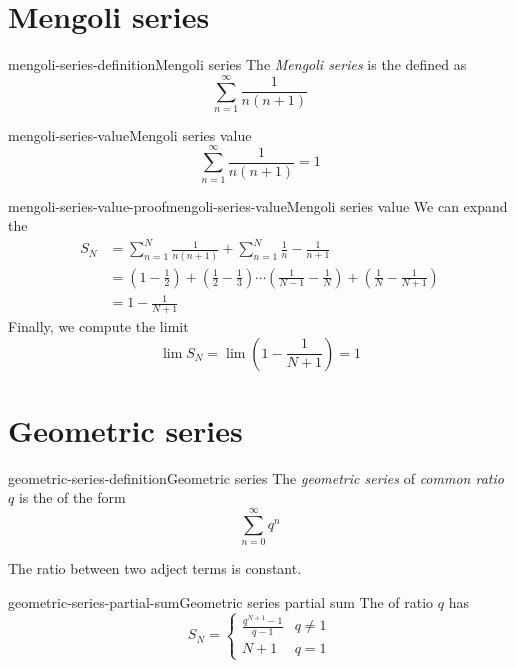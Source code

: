 \documentclass[preview]{standalone}
\begin{document}
\genpage

\section{Mengoli series}

\begin{snippetdefinition}{mengoli-series-definition}{Mengoli series}
    The \emph{Mengoli series} is the \series defined as
    \[
        \sum_{n=1}^\infty \frac{1}{n(n+1)}
    \]
\end{snippetdefinition}

\begin{snippetproposition}{mengoli-series-value}{Mengoli series value}
    \[
        \sum_{n=1}^\infty \frac{1}{n(n+1)} = 1
    \]
\end{snippetproposition}

\begin{snippetproof}{mengoli-series-value-proof}{mengoli-series-value}{Mengoli series value}
    We can expand the \partialsum
    \begin{align*}
        S_N &= \sum_{n=1}^N \frac{1}{n(n+1)} + \sum_{n=1}^N \frac{1}{n} - \frac{1}{n+1} \\
        &= \left(1 - \frac{1}{2}\right) + \left(\frac{1}{2} - \frac{1}{3}\right) \cdots \left(\frac{1}{N-1} - \frac{1}{N}\right)
        + \left(\frac{1}{N} - \frac{1}{N+1}\right) \\
        &= 1 - \frac{1}{N+1}
    \end{align*}
    Finally, we compute the limit
    \[
        \lim S_N = \lim \left(1 - \frac{1}{N+1}\right) = 1
    \]
\end{snippetproof}

\section{Geometric series}

\begin{snippetdefinition}{geometric-series-definition}{Geometric series}
    The \emph{geometric series} of \emph{common ratio} \(q\) is the \series of the form
    \[
        \sum_{n=0}^\infty q^n
    \]
\end{snippetdefinition}

\begin{plainhtml}
    The ratio between two adject terms is constant.
\end{plainhtml}

\begin{snippetproposition}{geometric-series-partial-sum}{Geometric series partial sum}
    The \geometricseries of ratio \(q\) has \partialsum
    \[
        S_N = \begin{cases}
            \frac{q^{N+1}-1}{q-1} & q \neq 1 \\
            N + 1 & q = 1
        \end{cases}
    \]
\end{snippetproposition}
\end{document}
